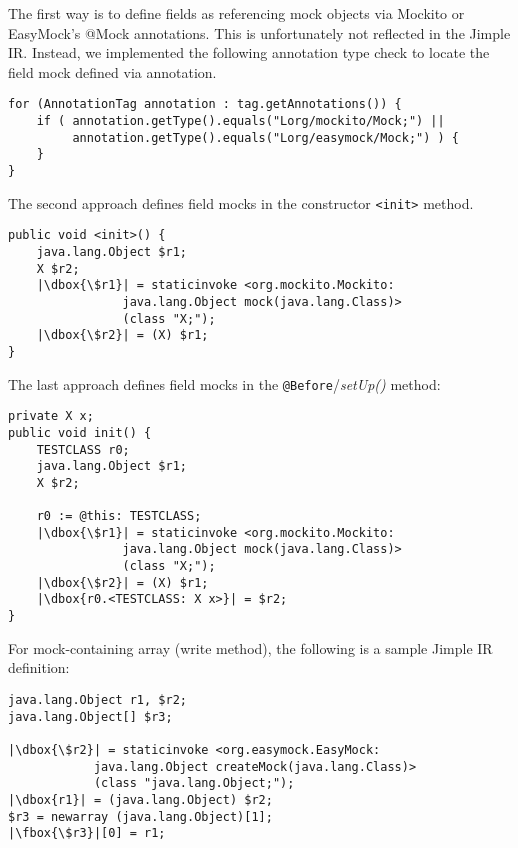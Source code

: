 The first way is to define fields as referencing mock objects via Mockito or EasyMock's @Mock annotations. This is unfortunately not reflected in the Jimple IR. Instead, we implemented the following annotation type check to locate the field mock defined via annotation.

\begin{lstlisting}[basicstyle=\linespread{1.0}\ttfamily\small,numbers=none,escapechar={|}]
for (AnnotationTag annotation : tag.getAnnotations()) {
	if ( annotation.getType().equals("Lorg/mockito/Mock;") ||
		 annotation.getType().equals("Lorg/easymock/Mock;") ) {
	}
}
\end{lstlisting}

The second approach defines field mocks in the constructor \texttt{<init>} method.

\begin{lstlisting}[basicstyle=\linespread{1.0}\ttfamily\small,numbers=none,escapechar={|}]
public void <init>() {
	java.lang.Object $r1;
	X $r2;
	|\dbox{\$r1}| = staticinvoke <org.mockito.Mockito:
				java.lang.Object mock(java.lang.Class)>
				(class "X;");
	|\dbox{\$r2}| = (X) $r1;
}
\end{lstlisting}

The last approach defines field mocks in the \texttt{@Before}/\textit{setUp()} method:

\begin{lstlisting}[basicstyle=\linespread{1.0}\ttfamily\small,numbers=none,escapechar={|}]
private X x;
public void init() {
	TESTCLASS r0;
	java.lang.Object $r1;
	X $r2;
	
	r0 := @this: TESTCLASS;
	|\dbox{\$r1}| = staticinvoke <org.mockito.Mockito:
				java.lang.Object mock(java.lang.Class)>
				(class "X;");
	|\dbox{\$r2}| = (X) $r1;
	|\dbox{r0.<TESTCLASS: X x>}| = $r2;
}
\end{lstlisting}

For mock-containing array (write method), the following is a sample Jimple IR definition:

\begin{lstlisting}[basicstyle=\linespread{1.0}\ttfamily\small,numbers=none,escapechar={|}]
java.lang.Object r1, $r2;
java.lang.Object[] $r3;

|\dbox{\$r2}| = staticinvoke <org.easymock.EasyMock:
			java.lang.Object createMock(java.lang.Class)>
			(class "java.lang.Object;");
|\dbox{r1}| = (java.lang.Object) $r2;
$r3 = newarray (java.lang.Object)[1];
|\fbox{\$r3}|[0] = r1;
\end{lstlisting}

